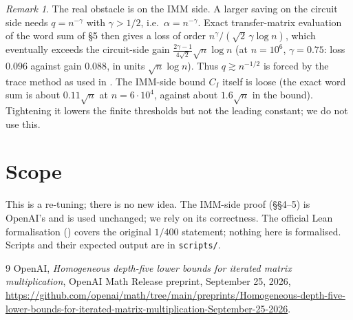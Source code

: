 \documentclass[10pt]{amsart}
\theoremstyle{remark}
\newtheorem{remark}[theorem]{Remark}
\begin{document}
\begin{remark}
The real obstacle is on the IMM side. A larger saving on the circuit side needs
$q=n^{-\gamma}$ with $\gamma>1/2$, i.e.\ $\alpha=n^{-\gamma}$. Exact transfer-matrix evaluation of
the word sum of \S5 then gives a loss of order $n^{\gamma}/(\sqrt2\,\gamma\log n)$, which
eventually exceeds the circuit-side gain $\frac{2\gamma-1}{4\sqrt2}\sqrt n\log n$
(at $n=10^6$, $\gamma=0.75$: loss $0.096$ against gain $0.088$, in units $\sqrt n\log n$).
Thus $q\gtrsim n^{-1/2}$ is forced by the trace method as used in \cite{OAI135}. The
IMM-side bound $C_I$ itself is loose (the exact word sum is about $0.11\sqrt n$ at $n=6\cdot10^4$,
against about $1.6\sqrt n$ in the bound). Tightening it lowers the finite thresholds but not the
leading constant; we do not use this.
\end{remark}

\section{Scope}
This is a re-tuning; there is no new idea. The IMM-side proof (\S\S4--5) is OpenAI's and is
used unchanged; we rely on its correctness. The official Lean formalisation () covers the
original $1/400$ statement; nothing here is formalised. Scripts and their expected output
are in \texttt{scripts/}.

\begin{thebibliography}{9}
 OpenAI, \emph{Homogeneous depth-five lower bounds for iterated matrix
multiplication}, OpenAI Math Release preprint, September 25, 2026,
\url{https://github.com/openai/math/tree/main/preprints/Homogeneous-depth-five-lower-bounds-for-iterated-matrix-multiplication-September-25-2026}.
\end{thebibliography}
\end{document}
